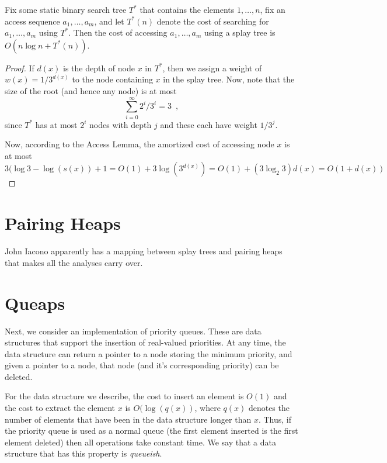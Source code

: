 {\begin{thm} 
Fix some static binary search tree $T^*$ that contains the elements
$1,\ldots,n$, fix an access sequence $a_1,\ldots,a_m$, and let $T^*(n)$
denote the cost of searching for $a_1,\ldots,a_m$ using $T^*$.  Then the
cost of accessing $a_1,\ldots,a_m$ using a splay tree is $O(n\log n + T^*(n))$.
\end{thm}

\begin{proof}
If $d(x)$ is the depth of node $x$ in $T^*$, then we assign a weight of
$w(x)=1/3^{d(x)}$ to the node containing $x$ in the splay tree.  Now, note that the size of the root (and hence any node) is at most 
\[
    \sum_{i=0}^\infty 2^i/3^i = 3 \enspace ,
\]
since $T^*$ has at most $2^i$ nodes with depth $j$ and these each have
weight $1/3^j$.

Now, according to the Access Lemma, the amortized cost of accessing node $x$ is
at most
\[
    3(\log 3 - \log(s(x)) + 1 = O(1) + 3\log(3^{d(x)}) 
    = O(1) + (3\log_2 3)d(x) = O(1+d(x))
\]
\end{proof}

\section{Pairing Heaps}

John Iacono apparently has a mapping between splay trees and pairing
heaps that makes all the analyses carry over.

\section{Queaps}

Next, we consider an implementation of priority queues.  These are
data structures that support the insertion of real-valued priorities.
At any time, the data structure can return a pointer to a node storing
the minimum priority, and given a pointer to a node, that node (and
it's corresponding priority) can be deleted.

For the data structure we describe, the cost to insert an element is
$O(1)$ and the cost to extract the element $x$ is $O(\log(q(x))$,
where $q(x)$ denotes the number of elements that have been in the data
structure longer than $x$.  Thus, if the priority queue is used as a
normal queue (the first element inserted is the first element deleted)
then all operations take constant time.  We say that a data structure
that has this property is \emph{queueish}.

}
